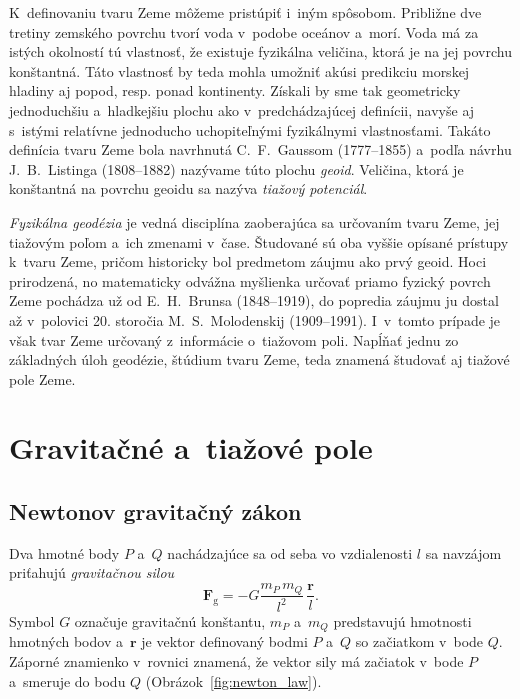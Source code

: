 \documentclass[a4paper, 12pt]{book}
\newcommand{\gidx}{\mathrm g}
\let\vec\mathbf
\begin{document}
K~definovaniu tvaru Zeme môžeme pristúpiť i~iným spôsobom.  Približne dve
tretiny zemského povrchu tvorí voda v~podobe oceánov a~morí.  Voda má za istých
okolností tú vlastnosť, že existuje fyzikálna veličina, ktorá je na jej povrchu
konštantná.  Táto vlastnosť by teda mohla umožniť akúsi predikciu morskej
hladiny aj popod, resp. ponad kontinenty.  Získali by sme tak geometricky
jednoduchšiu a~hladkejšiu plochu ako v~predchádzajúcej definícii, navyše aj
s~istými relatívne jednoducho uchopiteľnými fyzikálnymi vlastnosťami.  Takáto
definícia tvaru Zeme bola navrhnutá C.~F.~Gaussom (1777--1855) a~podľa návrhu
J.~B.~Listinga (1808--1882) nazývame túto plochu \emph{geoid}.  Veličina, ktorá
je konštantná na povrchu geoidu sa nazýva \emph{tiažový potenciál}.

\emph{Fyzikálna geodézia} je vedná disciplína zaoberajúca sa určovaním tvaru
Zeme, jej tiažovým poľom a~ich zmenami v~čase.  Študované sú oba vyššie opísané
prístupy k~tvaru Zeme, pričom historicky bol predmetom záujmu ako prvý geoid.
Hoci prirodzená, no matematicky odvážna myšlienka určovať priamo fyzický povrch
Zeme pochádza už od E.~H.~Brunsa (1848--1919), do popredia záujmu ju dostal až
v~polovici 20. storočia M.~S.~Molodenskij (1909--1991).  I~v~tomto prípade je
však tvar Zeme určovaný z~informácie o~tiažovom poli.  Napĺňať jednu zo
základných úloh geodézie, štúdium tvaru Zeme, teda znamená študovať aj tiažové
pole Zeme.







\chapter{Gravitačné a~tiažové pole}
\label{sec:gravitational_and_gravity_field}






\section{Newtonov gravitačný zákon}
\label{sec:newton_law}

Dva hmotné body $P$ a~$Q$ nachádzajúce sa od seba vo vzdialenosti $l$ sa
navzájom priťahujú \emph{gravitačnou silou}
%
\begin{equation}
\label{eq:newton_law}
\vec F_\gidx = -G \frac{m_P \, m_Q}{l^2} \, \frac{\vec r}{l}{.}
\end{equation}
%
Symbol $G$ označuje gravitačnú konštantu, $m_P$ a~$m_Q$ predstavujú hmotnosti
hmotných bodov a~$\vec r$ je vektor definovaný bodmi $P$ a~$Q$ so začiatkom
v~bode $Q$.  Záporné znamienko v~rovnici znamená, že vektor sily má začiatok
v~bode $P$ a~smeruje do bodu $Q$ (Obrázok~\ref{fig:newton_law}).
\end{document}

